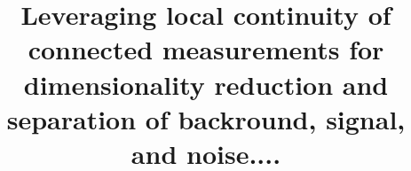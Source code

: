 \documentclass[12pt]{iopart}
\begin{document}
\title[]{Leveraging local continuity of connected measurements for dimensionality reduction and separation of backround, signal, and noise.... }

\author{}


%
%

%
%
%
% 
%
\end{document}
